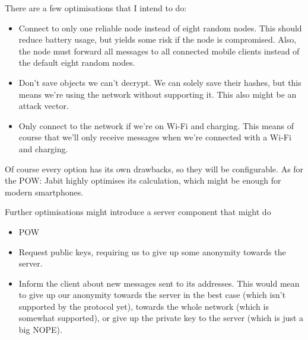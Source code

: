 \documentclass{bfh}
\begin{document}
  There are a few optimisations that I intend to do:
  \begin{itemize}
    \item Connect to only one reliable node instead of eight random nodes. This should reduce battery usage, but yields some risk if the node is compromised. Also, the node must forward all messages to all connected mobile clients instead of the default eight random nodes.
    \item Don't save objects we can't decrypt. We can solely save their hashes, but this means we're using the network without supporting it. This also might be an attack vector.
    \item Only connect to the network if we're on Wi-Fi and charging. This means of course that we'll only receive messages when we're connected with a Wi-Fi and charging.
  \end{itemize}
  Of course every option has its own drawbacks, so they will be configurable. As for the POW: Jabit highly optimises its calculation, which might be enough for modern smartphones.

  Further optimisations might introduce a server component that might do
  \begin{itemize}
    \item POW
    \item Request public keys, requiring us to give up some anonymity towards the server.
    \item Inform the client about new messages sent to its addresses. This would mean to give up our anonymity towards the server in the best case (which isn't supported by the protocol yet), towards the whole network (which is somewhat supported), or give up the private key to the server (which is just a big NOPE).
  \end{itemize}
\end{document}
